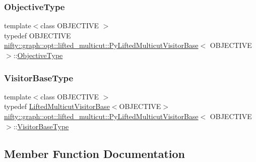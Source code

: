 \subsubsection{\texorpdfstring{Objective\+Type}{ObjectiveType}}
{\footnotesize\ttfamily template$<$class O\+B\+J\+E\+C\+T\+I\+VE $>$ \\
typedef O\+B\+J\+E\+C\+T\+I\+VE \hyperlink{classnifty_1_1graph_1_1opt_1_1lifted__multicut_1_1PyLiftedMulticutVisitorBase}{nifty\+::graph\+::opt\+::lifted\+\_\+multicut\+::\+Py\+Lifted\+Multicut\+Visitor\+Base}$<$ O\+B\+J\+E\+C\+T\+I\+VE $>$\+::\hyperlink{classnifty_1_1graph_1_1opt_1_1lifted__multicut_1_1PyLiftedMulticutVisitorBase_a9e8855d94040cf1e16d59cad6a8dabd5}{Objective\+Type}}

\mbox{\label{classnifty_1_1graph_1_1opt_1_1lifted__multicut_1_1PyLiftedMulticutVisitorBase_a559b64ba9b334622ef91ec4e2e927be4}} 
\subsubsection{\texorpdfstring{Visitor\+Base\+Type}{VisitorBaseType}}
{\footnotesize\ttfamily template$<$class O\+B\+J\+E\+C\+T\+I\+VE $>$ \\
typedef \hyperlink{namespacenifty_1_1graph_1_1opt_1_1lifted__multicut_a3350124f8869505fecf39d697b9b2718}{Lifted\+Multicut\+Visitor\+Base}$<$O\+B\+J\+E\+C\+T\+I\+VE$>$ \hyperlink{classnifty_1_1graph_1_1opt_1_1lifted__multicut_1_1PyLiftedMulticutVisitorBase}{nifty\+::graph\+::opt\+::lifted\+\_\+multicut\+::\+Py\+Lifted\+Multicut\+Visitor\+Base}$<$ O\+B\+J\+E\+C\+T\+I\+VE $>$\+::\hyperlink{classnifty_1_1graph_1_1opt_1_1lifted__multicut_1_1PyLiftedMulticutVisitorBase_a559b64ba9b334622ef91ec4e2e927be4}{Visitor\+Base\+Type}}



\subsection{Member Function Documentation}
\mbox{\label{classnifty_1_1graph_1_1opt_1_1lifted__multicut_1_1PyLiftedMulticutVisitorBase_ad7e8835d70def796b71cff0caa79c596}} 

